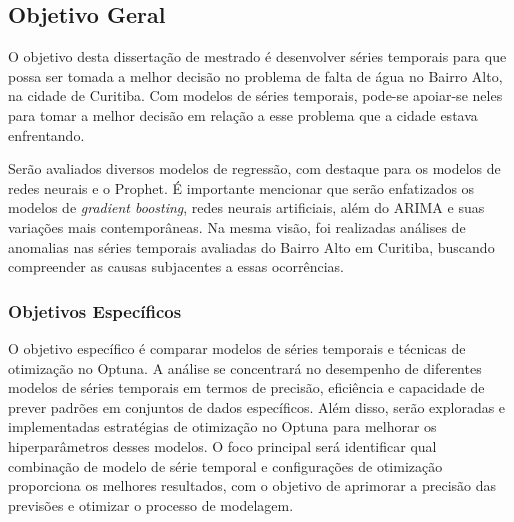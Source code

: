 \subsection{Objetivo Geral} \label{subsec:objetivos}

O objetivo desta dissertação de mestrado é desenvolver séries temporais para que possa ser tomada a melhor decisão no problema de falta de água no Bairro Alto, na cidade de Curitiba. Com modelos de séries temporais, pode-se apoiar-se neles para tomar a melhor decisão em relação a esse problema que a cidade estava enfrentando.

Serão avaliados diversos modelos de regressão, com destaque para os modelos de redes neurais e o Prophet. É importante mencionar que serão enfatizados os modelos de \textit{gradient boosting}, redes neurais artificiais, além do ARIMA e suas variações mais contemporâneas. Na mesma visão, foi realizadas análises de anomalias nas séries temporais avaliadas do Bairro Alto em Curitiba, buscando compreender as causas subjacentes a essas ocorrências.
    
    
\subsubsection{Objetivos Espec\'ificos} \label{subsubsec:obespec}
    
O objetivo específico é comparar modelos de séries temporais e técnicas de otimização no Optuna. A análise se concentrará no desempenho de diferentes modelos de séries temporais em termos de precisão, eficiência e capacidade de prever padrões em conjuntos de dados específicos. Além disso, serão exploradas e implementadas estratégias de otimização no Optuna para melhorar os hiperparâmetros desses modelos. O foco principal será identificar qual combinação de modelo de série temporal e configurações de otimização proporciona os melhores resultados, com o objetivo de aprimorar a precisão das previsões e otimizar o processo de modelagem.
    
